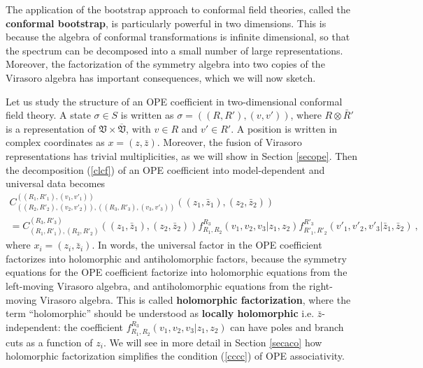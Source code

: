 \documentclass[12pt,a4paper,notitlepage]{report}
\numberwithin{equation}{section}
\theoremstyle{break}
\begin{document}
The application of the bootstrap approach to conformal field theories, called the \textbf{conformal bootstrap}, 
is particularly powerful in two dimensions. This is because the algebra of conformal transformations is infinite dimensional, 
so that the spectrum can be decomposed into a small number of large representations. Moreover, the factorization of the symmetry algebra into two copies of the Virasoro algebra has important consequences, which we will now sketch. 

Let us study the structure of an OPE coefficient in two-dimensional conformal field theory. A state $\sigma\in S$ is written as $\sigma = ((R,R'),(v,v'))$, where $R\otimes \bar{R}'$ is a representation of  $\mathfrak{V}\times \overline{\mathfrak{V}}$, with $v\in R$ and $v'\in R'$. 
A position is written in complex coordinates as $x=(z,\bar{z})$. Moreover, the fusion of Virasoro representations has trivial multiplicities, as we will show in Section \ref{secope}. 
Then the decomposition (\ref{clcf}) of an OPE coefficient into model-dependent and universal data becomes
\begin{multline}
 C^{((R_1,R'_1),(v_1,v'_1))}_{((R_2,R'_2),(v_2,v'_2)),((R_3,R'_3),(v_3,v'_3))}((z_1,\bar{z}_1),(z_2,\bar{z}_2)) 
\\
= C^{(R_3,R'_3)}_{(R_1,R'_1),(R_2,R'_2)}((z_1,\bar{z}_1),(z_2,\bar{z}_2)) f^{R_3}_{R_1,R_2}(v_1,v_2,v_3|z_1,z_2) f^{R'_3}_{R'_1,R'_2}(v'_1,v'_2,v'_3|\bar{z}_1,\bar{z}_2) \ ,
\label{ccff}
\end{multline}
where $x_i=(z_i,\bar{z}_i)$. In words, the universal factor in the OPE coefficient factorizes into holomorphic and antiholomorphic factors, because the symmetry equations for the OPE coefficient factorize into holomorphic equations from the left-moving Virasoro algebra, and antiholomorphic equations from the right-moving Virasoro algebra. This is called \textbf{\boldmath holomorphic factorization}, where the term ``holomorphic''
should be understood as \textbf{\boldmath locally holomorphic} i.e. $\bar{z}$-independent: the coefficient $f^{R_3}_{R_1,R_2}(v_1,v_2,v_3|z_1,z_2)$ can have poles and branch cuts as a function of $z_i$. We will see in more detail in Section \ref{secaco} how holomorphic factorization simplifies the condition (\ref{cccc}) of OPE associativity.
\end{document}
